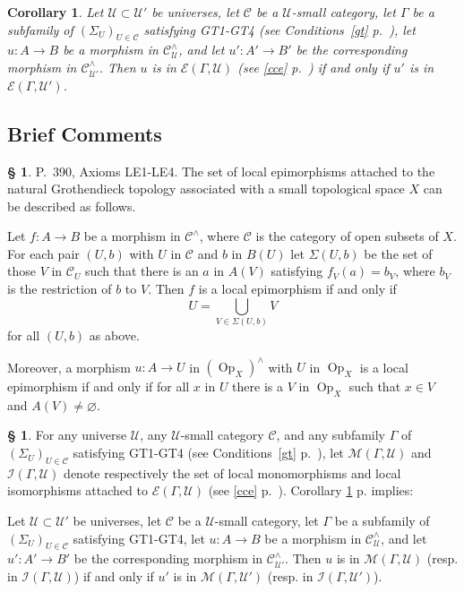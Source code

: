 \documentclass[12pt]{article}
\newtheorem{cor}[thm]{Corollary}
\theoremstyle{remark}
\theoremstyle{definition}
\newtheorem{s}[thm]{\S}
\newcommand{\cc}{\mathcal}
\newcommand{\oo}{\operatorname}
\newcommand{\C}{\mathcal C}
\newcommand{\U}{\mathcal U}
\begin{document}
\begin{cor}\label{leu}
Let $\U\subset\U'$ be universes, let $\C$ be a $\U$-small category, let $\Gamma$ be a subfamily of $(\Sigma_U)_{U\in\C}$ satisfying GT1-GT4 (see Conditions~\ref{gt} p.~\pageref{gt}), let $u:A\to B$ be a morphism in $\C^\wedge_\U$, and let $u':A'\to B'$ be the corresponding morphism in $\C^\wedge_{\U'}$. Then $u$ is in $\cc E(\Gamma,\U)$ (see \eqref{cce} p.~\pageref{cce}) if and only if $u'$ is in $\cc E(\Gamma,\U')$.
\end{cor}


\subsection{Brief Comments}

\begin{s}\label{390}
P.~390, Axioms LE1-LE4. The set of local epimorphisms attached to the natural Grothendieck topology associated with a small topological space $X$ can be described as follows. 

Let $f:A\to B$ be a morphism in $\C^\wedge$, where $\C$ is the category of open subsets of $X$. For each pair $(U,b)$ with $U$ in $\C$ and $b$ in $B(U)$ let $\Sigma(U,b)$ be the set of those $V$ in $\C_U$ such that there is an $a$ in $A(V)$ satisfying $f_V(a)=b_V$, where $b_V$ is the restriction of $b$ to $V$. Then $f$ is a local epimorphism if and only if 
$$
U=\bigcup_{V\in\Sigma(U,b)}V
$$ 
for all $(U,b)$ as above.

Moreover, a morphism $u:A\to U$ in $(\oo{Op}_X)^\wedge$ with $U$ in $\oo{Op}_X$ is a local epimorphism if and only if for all $x$ in $U$ there is a $V$ in $\oo{Op}_X$ such that $x\in V$ and $A(V)\ne\varnothing$. 
\end{s}


\begin{s}
For any universe $\U$, any $\U$-small category $\C$, and any subfamily $\Gamma$ of $(\Sigma_U)_{U\in\C}$ satisfying GT1-GT4 (see Conditions~\ref{gt} p.~\pageref{gt}), let $\cc M(\Gamma,\U)$ and $\cc I(\Gamma,\U)$ denote respectively the set of local monomorphisms and local isomorphisms attached to $\cc E(\Gamma,\U)$ (see \eqref{cce} p.~\pageref{cce}). Corollary \ref{leu} p. \pageref{leu} implies:

Let $\U\subset\U'$ be universes, let $\C$ be a $\U$-small category, let $\Gamma$ be a subfamily of $(\Sigma_U)_{U\in\C}$ satisfying GT1-GT4, let $u:A\to B$ be a morphism in $\C^\wedge_\U$, and let $u':A'\to B'$ be the corresponding morphism in $\C^\wedge_{\U'}$. Then $u$ is in $\cc M(\Gamma,\U)$ (resp. in $\cc I(\Gamma,\U)$) if and only if $u'$ is in $\cc M(\Gamma,\U')$ (resp. in $\cc I(\Gamma,\U')$).
\end{s}
\end{document}

